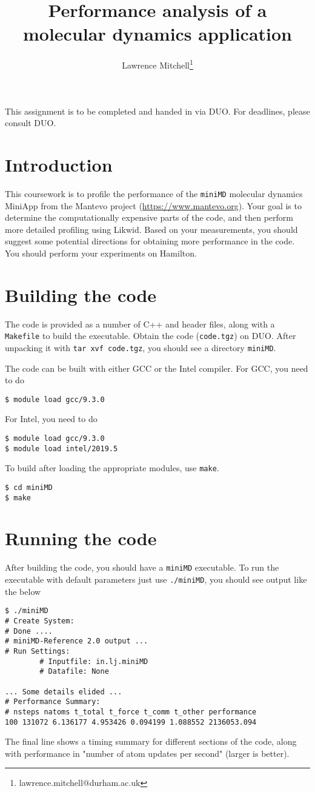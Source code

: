 \documentclass[a4paper]{article}
\title{Performance analysis of a molecular dynamics application}
\author{Lawrence Mitchell\thanks{lawrence.mitchell@durham.ac.uk}}
\begin{document}
\maketitle

This assignment is to be completed and handed in via DUO. 
For deadlines, please consult DUO.

\section{Introduction}
\label{sec:introduction}

This coursework is to profile the performance of the \texttt{miniMD}
molecular dynamics MiniApp from the Mantevo project
(\url{https://www.mantevo.org}). Your goal is to determine the
computationally expensive parts of the code, and then perform more
detailed profiling using Likwid. Based on your measurements, you
should suggest some potential directions for obtaining more
performance in the code. You should perform your experiments on
Hamilton.

\section{Building the code}
\label{sec:build}

The code is provided as a number of C++ and header files, along with a
\texttt{Makefile} to build the executable. Obtain the code
(\texttt{code.tgz}) on DUO. After unpacking it with \texttt{tar xvf
  code.tgz}, you should see a directory \texttt{miniMD}.

The code can be built with either GCC or the Intel compiler. For GCC,
you need to do
\begin{verbatim}
$ module load gcc/9.3.0
\end{verbatim}
For Intel, you need to do
\begin{verbatim}
$ module load gcc/9.3.0
$ module load intel/2019.5
\end{verbatim}
To build after loading the appropriate modules, use \texttt{make}.
\begin{verbatim}
$ cd miniMD
$ make
\end{verbatim}

\section{Running the code}
\label{sec:run}
After building the code, you should have a \texttt{miniMD} executable.
To run the executable with default parameters just use
\texttt{./miniMD}, you should see output like the below
\begin{verbatim}
$ ./miniMD
# Create System:
# Done .... 
# miniMD-Reference 2.0 output ...
# Run Settings: 
        # Inputfile: in.lj.miniMD
        # Datafile: None

... Some details elided ...
# Performance Summary:
# nsteps natoms t_total t_force t_comm t_other performance
100 131072 6.136177 4.953426 0.094199 1.088552 2136053.094
\end{verbatim}
The final line shows a timing summary for different sections of the
code, along with performance in "number of atom updates per second"
(larger is better).
\end{document}
